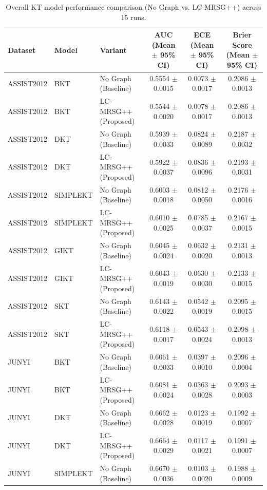 \begin{table}[htbp]
\centering
\caption{Overall KT model performance comparison (No Graph vs. LC-MRSG++) across 15 runs.}
\label{tab:overall-perf-calibration}
\begin{tabular}{lllccc}
\hline
Dataset & Model & Variant & AUC (Mean $\pm$ 95\% CI) & ECE (Mean $\pm$ 95\% CI) & Brier Score (Mean $\pm$ 95\% CI) \\
\hline
ASSIST2012 & BKT & No Graph (Baseline) & 0.5554 $\pm$ 0.0015 & 0.0073 $\pm$ 0.0017 & 0.2086 $\pm$ 0.0013 \\
ASSIST2012 & BKT & LC-MRSG++ (Proposed) & 0.5544 $\pm$ 0.0020 & 0.0078 $\pm$ 0.0017 & 0.2086 $\pm$ 0.0013 \\
ASSIST2012 & DKT & No Graph (Baseline) & 0.5939 $\pm$ 0.0033 & 0.0824 $\pm$ 0.0089 & 0.2187 $\pm$ 0.0032 \\
ASSIST2012 & DKT & LC-MRSG++ (Proposed) & 0.5922 $\pm$ 0.0037 & 0.0836 $\pm$ 0.0096 & 0.2193 $\pm$ 0.0031 \\
ASSIST2012 & SIMPLEKT & No Graph (Baseline) & 0.6003 $\pm$ 0.0018 & 0.0812 $\pm$ 0.0050 & 0.2176 $\pm$ 0.0016 \\
ASSIST2012 & SIMPLEKT & LC-MRSG++ (Proposed) & 0.6010 $\pm$ 0.0025 & 0.0785 $\pm$ 0.0037 & 0.2167 $\pm$ 0.0015 \\
ASSIST2012 & GIKT & No Graph (Baseline) & 0.6045 $\pm$ 0.0024 & 0.0632 $\pm$ 0.0020 & 0.2131 $\pm$ 0.0013 \\
ASSIST2012 & GIKT & LC-MRSG++ (Proposed) & 0.6043 $\pm$ 0.0019 & 0.0630 $\pm$ 0.0030 & 0.2133 $\pm$ 0.0015 \\
ASSIST2012 & SKT & No Graph (Baseline) & 0.6143 $\pm$ 0.0022 & 0.0542 $\pm$ 0.0019 & 0.2095 $\pm$ 0.0015 \\
ASSIST2012 & SKT & LC-MRSG++ (Proposed) & 0.6118 $\pm$ 0.0017 & 0.0543 $\pm$ 0.0024 & 0.2098 $\pm$ 0.0013 \\
\hline
JUNYI & BKT & No Graph (Baseline) & 0.6061 $\pm$ 0.0033 & 0.0397 $\pm$ 0.0010 & 0.2096 $\pm$ 0.0004 \\
JUNYI & BKT & LC-MRSG++ (Proposed) & 0.6081 $\pm$ 0.0024 & 0.0363 $\pm$ 0.0028 & 0.2093 $\pm$ 0.0003 \\
JUNYI & DKT & No Graph (Baseline) & 0.6662 $\pm$ 0.0028 & 0.0123 $\pm$ 0.0019 & 0.1992 $\pm$ 0.0007 \\
JUNYI & DKT & LC-MRSG++ (Proposed) & 0.6664 $\pm$ 0.0029 & 0.0117 $\pm$ 0.0021 & 0.1991 $\pm$ 0.0007 \\
JUNYI & SIMPLEKT & No Graph (Baseline) & 0.6670 $\pm$ 0.0036 & 0.0103 $\pm$ 0.0020 & 0.1988 $\pm$ 0.0009 \\

\end{tabular}
\end{table}
